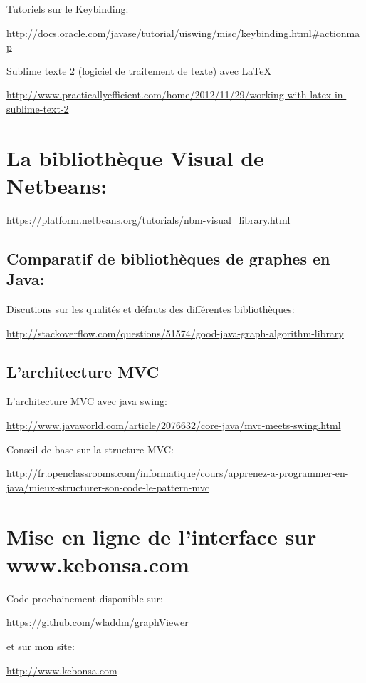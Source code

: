 \documentclass[french]{article}
\begin{document}
    Tutoriels sur le Keybinding:

    \url{http://docs.oracle.com/javase/tutorial/uiswing/misc/keybinding.html\#actionmap}

    Sublime texte 2 (logiciel de traitement de texte) avec \LaTeX{}

    \url{http://www.practicallyefficient.com/home/2012/11/29/working-with-latex-in-sublime-text-2}

  \section{La bibliothèque Visual de Netbeans:}

    \url{https://platform.netbeans.org/tutorials/nbm-visual_library.html}

  \subsection{Comparatif de bibliothèques de graphes en Java:}

    Discutions sur les qualités et défauts des différentes bibliothèques:

    \url{http://stackoverflow.com/questions/51574/good-java-graph-algorithm-library}


  \subsection{L'architecture MVC}

    L'architecture MVC avec java swing:

    \url{http://www.javaworld.com/article/2076632/core-java/mvc-meets-swing.html}

    Conseil de base sur la structure MVC:
    
    \url{http://fr.openclassrooms.com/informatique/cours/apprenez-a-programmer-en-java/mieux-structurer-son-code-le-pattern-mvc}


\section{Mise en ligne de l'interface sur www.kebonsa.com}

  Code prochainement disponible sur:

  \url{https://github.com/wladdm/graphViewer}

  et sur mon site:

  \url{http://www.kebonsa.com}
\end{document}
